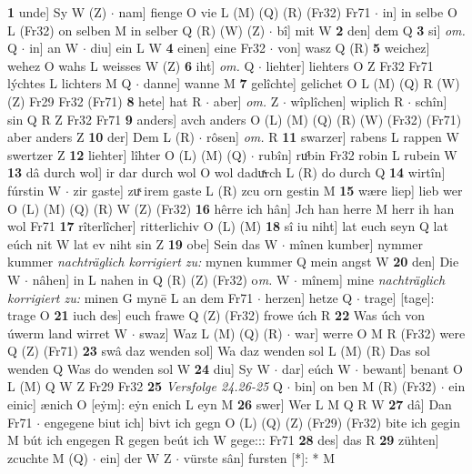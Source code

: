 \documentclass[8pt,a4paper,notitlepage]{article}
\begin{document}
\begin{table}[ht]
\begin{minipage}[t]{0.5\linewidth}
\textbf{1} unde] Sy W (Z)  $\cdot$ nam] fienge O vie L (M) (Q) (R) (Fr32) Fr71  $\cdot$ in] in selbe O L (Fr32) on selben M in selber Q (R) (W) (Z)  $\cdot$ bî] mit W \textbf{2} den] dem Q \textbf{3} si] \textit{om.} Q  $\cdot$ in] an W  $\cdot$ diu] ein L W \textbf{4} einen] eine Fr32  $\cdot$ von] wasz Q (R) \textbf{5} weichez] wehez O wahs L weisses W (Z) \textbf{6} iht] \textit{om.} Q  $\cdot$ liehter] liehters O Z Fr32 Fr71 lýchtes L lichters M Q  $\cdot$ danne] wanne M \textbf{7} gelîchte] gelichet O L (M) (Q) R (W) (Z) Fr29 Fr32 (Fr71) \textbf{8} hete] hat R  $\cdot$ aber] \textit{om.} Z  $\cdot$ wîplîchen] wiplich R  $\cdot$ schîn] sin Q R Z Fr32 Fr71 \textbf{9} anders] avch anders O (L) (M) (Q) (R) (W) (Fr32) (Fr71) aber anders Z \textbf{10} der] Dem L (R)  $\cdot$ rôsen] \textit{om.} R \textbf{11} swarzer] rabens L rappen W swertzer Z \textbf{12} liehter] lîhter O (L) (M) (Q)  $\cdot$ rubîn] ruͦbin Fr32 robin L rubein W \textbf{13} dâ durch wol] ir dar durch wol O wol daduͯrch L (R) do durch Q \textbf{14} wirtîn] fúrstin W  $\cdot$ zir gaste] zuͯ irem gaste L (R) zcu orn gestin M \textbf{15} wære liep] lieb wer O (L) (M) (Q) (R) W (Z) (Fr32) \textbf{16} hêrre ich hân] Jch han herre M herr ih han wol Fr71 \textbf{17} rîterlîcher] ritterlichiv O (L) (M) \textbf{18} sî iu niht] lat euch seyn Q lat eúch nit W lat ev niht sin Z \textbf{19} obe] Sein das W  $\cdot$ mînen kumber] nymmer kummer \textit{nachträglich korrigiert zu:} mynen kummer Q mein angst W \textbf{20} den] Die W  $\cdot$ nâhen] in L nahen in Q (R) (Z) (Fr32) o\textit{m. } W  $\cdot$ mînem] mine \textit{nachträglich korrigiert zu:} minen G mynē L an dem Fr71  $\cdot$ herzen] hetze Q  $\cdot$ trage] [tage]: trage O \textbf{21} iuch des] euch frawe Q (Z) (Fr32) frowe úch R \textbf{22} Was úch von úwerm land wirret W  $\cdot$ swaz] Waz L (M) (Q) (R)  $\cdot$ war] werre O M R (Fr32) were Q (Z) (Fr71) \textbf{23} swâ daz wenden sol] Wa daz wenden sol L (M) (R) Das sol wenden Q Was do wenden sol W \textbf{24} diu] Sy W  $\cdot$ dar] eúch W  $\cdot$ bewant] benant O L (M) Q W Z Fr29 Fr32 \textbf{25} \textit{Versfolge 24.26-25} Q   $\cdot$ bin] on ben M (R) (Fr32)  $\cdot$ ein einic] ænich O [eẏm]: eẏn enich L eyn M \textbf{26} swer] Wer L M Q R W \textbf{27} dâ] Dan Fr71  $\cdot$ engegene biut ich] bivt ich gegn O (L) (Q) (Z) (Fr29) (Fr32) bite ich gegin M bút ich engegen R gegen beút ich W gege::: Fr71 \textbf{28} des] das R \textbf{29} zühten] zcuchte M (Q)  $\cdot$ ein] der W Z  $\cdot$ vürste sân] fursten [*]: * M \newline
\end{minipage}

\end{table}
\end{document}
